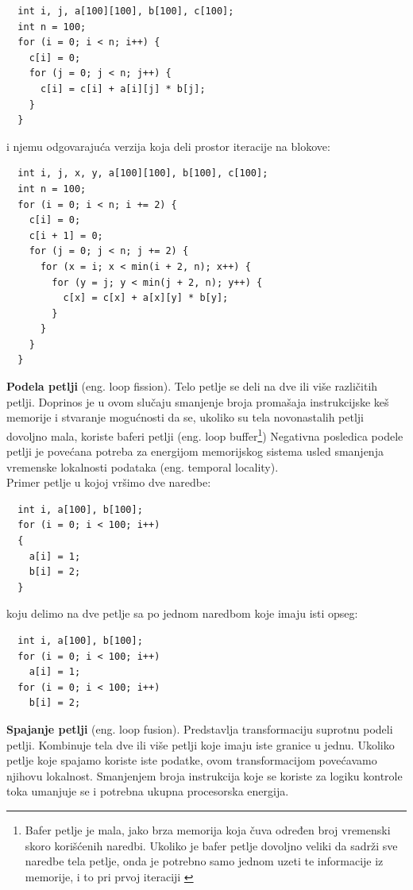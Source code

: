 \documentclass[a4paper]{article}
\begin{document}
\begin{lstlisting}
  int i, j, a[100][100], b[100], c[100];
  int n = 100;
  for (i = 0; i < n; i++) {
    c[i] = 0;
    for (j = 0; j < n; j++) {
      c[i] = c[i] + a[i][j] * b[j];
    }
  }
\end{lstlisting}
i njemu odgovarajuća verzija koja deli prostor iteracije na blokove:
\begin{lstlisting}
  int i, j, x, y, a[100][100], b[100], c[100];
  int n = 100;
  for (i = 0; i < n; i += 2) {
    c[i] = 0;
    c[i + 1] = 0;
    for (j = 0; j < n; j += 2) {
      for (x = i; x < min(i + 2, n); x++) {
        for (y = j; y < min(j + 2, n); y++) {
          c[x] = c[x] + a[x][y] * b[y];
        }
      }
    }
  }
\end{lstlisting}

\textbf{Podela petlji} (eng. loop fission). Telo petlje se deli na dve ili više različitih petlji. 
Doprinos je u ovom slučaju smanjenje broja promašaja instrukcijske keš memorije i stvaranje mogućnosti da se, 
ukoliko su tela novonastalih petlji dovoljno mala, 
koriste baferi petlji (eng. loop buffer\footnote{Bafer petlje je mala, jako brza memorija koja čuva određen broj vremenski skoro korišćenih naredbi. Ukoliko je bafer petlje dovoljno veliki da sadrži sve naredbe tela petlje, onda je potrebno samo jednom uzeti te informacije iz memorije, i to pri prvoj iteraciji \cite{stallings2000computer}}) Negativna posledica podele petlji je povećana potreba za energijom memorijskog sistema usled smanjenja vremenske lokalnosti podataka (eng. temporal locality).\\
Primer petlje u kojoj vršimo dve naredbe:
\begin{lstlisting}
  int i, a[100], b[100];
  for (i = 0; i < 100; i++)
  {
    a[i] = 1; 
    b[i] = 2;
  }
\end{lstlisting}
koju delimo na dve petlje sa po jednom naredbom koje imaju isti opseg:
\begin{lstlisting}
  int i, a[100], b[100];
  for (i = 0; i < 100; i++)
    a[i] = 1;                     
  for (i = 0; i < 100; i++)
    b[i] = 2;
\end{lstlisting}

\textbf{Spajanje petlji} (eng. loop fusion). Predstavlja transformaciju suprotnu podeli petlji. Kombinuje tela dve ili više petlji koje imaju iste
granice u jednu. Ukoliko petlje koje spajamo koriste iste podatke, ovom transformacijom povećavamo
njihovu lokalnost. Smanjenjem broja instrukcija koje se koriste za logiku kontrole toka umanjuje se 
i potrebna ukupna procesorska energija.\\
\end{document}
